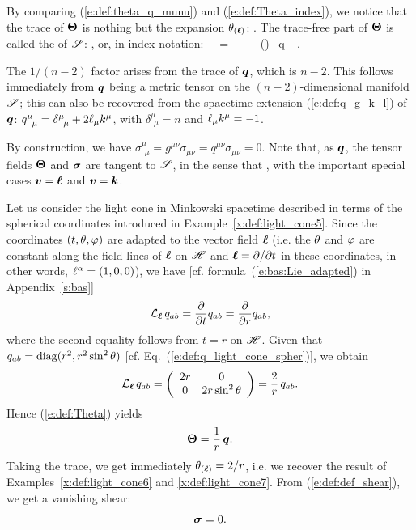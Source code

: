 By comparing (\ref{e:def:theta_q_munu}) and (\ref{e:def:Theta_index}), we
notice that the trace of $\bm{\Theta}$ is nothing but the expansion
$\theta_{(\bm{\ell})}$:
\be
   .
\ee
The trace-free part of $\bm{\Theta}$ is called the 
of $\mathscr{S}$:
\be \label{e:def:def_shear}
     ,
\ee
or, in index notation:
\be
    \sigma_{\alpha\beta} = \Theta_{\alpha\beta} -  \theta_{(\wl)} \, q_{\alpha\beta} .
\ee
\begin{remark}
The $1/(n-2)$ factor arises from the trace of $\bm{q}$, which is $n-2$.
This follows immediately from $\bm{q}$ being a metric tensor on the
$(n-2)$-dimensional manifold $\mathscr{S}$; this can also be recovered from the
spacetime extension (\ref{e:def:q_g_k_l}) of $\bm{q}$:
$q^\mu_{\ \, \mu} = \delta^\mu_{\ \, \mu} + 2 \el_\mu k^\mu$,
with $\delta^\mu_{\ \, \mu} = n$ and $\ell_\mu k^\mu=-1$.
\end{remark}
By construction, we have
$\sigma^\mu_{\ \, \mu} = g^{\mu\nu} \sigma_{\mu\nu} = q^{\mu\nu} \sigma_{\mu\nu} = 0$.
Note that, as $\bm{q}$, the tensor fields
$\bm{\Theta}$ and $\bm{\sigma}$ are tangent to $\mathscr{S}$, in the sense
that
\be \label{e:def:Theta_sigma_tangent}
   ,
\ee
with the important special cases $\bm{v} = \bm{\ell}$ and $\bm{v} = \bm{k}$.

\begin{example} \label{x:def:light_cone8}
Let us consider the light cone in Minkowski spacetime described in terms of the
spherical coordinates introduced in Example~\ref{x:def:light_cone5}.
Since the coordinates $(t,\theta,\varphi)$
are adapted to the vector field $\bm{\ell}$ (i.e. the $\theta$ and $\varphi$ are constant
along the field lines of $\bm{\ell}$ on $\mathscr{H}$ and $\bm{\ell} = \partial/\partial t$ in these
coordinates, in other words, $\ell^\alpha=(1,0,0)$), we have [cf. formula~(\ref{e:bas:Lie_adapted})
in Appendix~\ref{s:bas}]
\[
    {\mathcal{L}}_{\bm{\ell}}\, q_{ab} = \frac{\partial }{\partial t} q_{ab} = \frac{\partial }{\partial r} q_{ab} ,
\]
where the second equality follows from $t=r$ on $\mathscr{H}$. Given that
$q_{ab} = \mathrm{diag}(r^2, r^2\sin^2\theta)$
[cf. Eq.~(\ref{e:def:q_light_cone_spher})], we obtain
\[
    {\mathcal{L}}_{\bm{\ell}}\, q_{ab} = \left( \begin{array}{cc}
        2 r & 0  \\
        0 & 2 r \sin^2\theta
        \end{array} \right)
        = \frac{2}{r} \, q_{ab} .
\]
Hence (\ref{e:def:Theta}) yields
\[
    \bm{\Theta} = \frac{1}{r} \, \bm{q} .
\]
Taking the trace, we get immediately $\theta_{(\bm{\ell})} = 2/r$, i.e. we recover
the result of Examples~\ref{x:def:light_cone6} and \ref{x:def:light_cone7}.
From (\ref{e:def:def_shear}), we get a vanishing shear:
\[
    \bm{\sigma} = 0 .
\]
\end{example}

